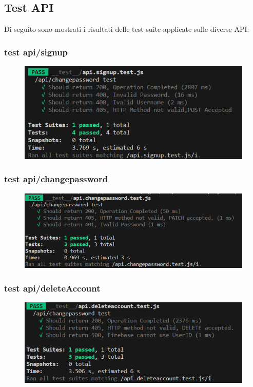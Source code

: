 \documentclass[11pt, a4paper]{article}
\theoremstyle{definition}
\begin{document}
\subsection{Test API}
Di seguito sono mostrati i risultati delle test suite applicate sulle diverse API.

\subsubsection{test api/signup}
\begin{figure}[H]
  \centering
  \includegraphics[scale = 1.1]{materiale/testing/Signup.png}
\end{figure}

\subsubsection{test api/changepassword}
\begin{figure}[H]
  \centering
  \includegraphics[width = \textwidth]{materiale/testing/ChangePw.png}
\end{figure}

\subsubsection{test api/deleteAccount}
\begin{figure}[H]
  \centering
  \includegraphics[width = \textwidth]{materiale/testing/DeleteAccount.png}
\end{figure}
\end{document}
